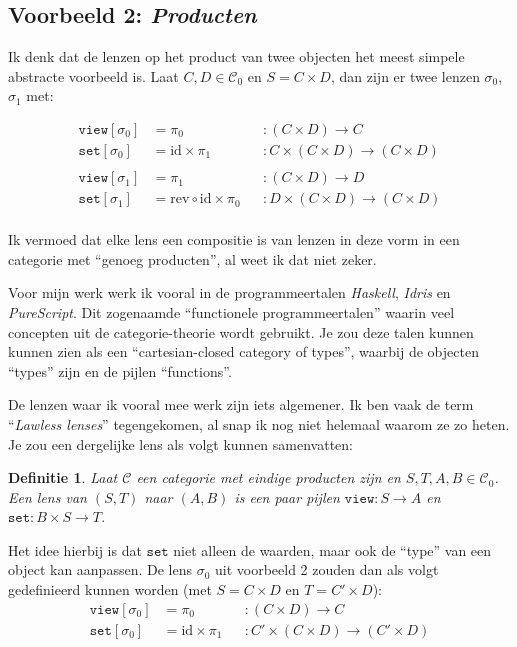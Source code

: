 \documentclass{article}
\newcommand{\id}[0]{\mathrm{id}}
\newtheorem{definition}{Definitie}
\begin{document}
\subsection*{Voorbeeld 2: \emph{Producten}}

Ik denk dat de lenzen op het product van twee objecten het meest simpele abstracte voorbeeld is. Laat $C,D \in \mathcal{C}_0$ en $S = C \times D$, dan zijn er twee lenzen $\sigma_0$, $\sigma_1$ met:

\begin{align*}
	\mathtt{view} [{\sigma_0}] &= \pi_0 &&: (C \times D) \to C \\
	\mathtt{set}  [{\sigma_0}] &= \id \times \pi_1 &&: C \times (C \times D) \to (C \times D) \\
	\\
	\mathtt{view} [{\sigma_1}] &= \pi_1 &&: (C \times D) \to D \\
	\mathtt{set}  [{\sigma_1}] &= \mathrm{rev} \circ \id \times \pi_0 &&: D \times (C \times D) \to (C \times D) \\
\end{align*}

Ik vermoed dat elke lens een compositie is van lenzen in deze vorm in een categorie met ``genoeg producten'', al weet ik dat niet zeker. 

\bigskip

Voor mijn werk werk ik vooral in de programmeertalen \emph{Haskell}, \emph{Idris} en \emph{PureScript}. Dit zogenaamde ``functionele programmeertalen'' waarin veel concepten uit de categorie-theorie wordt gebruikt. Je zou deze talen kunnen kunnen zien als een ``cartesian-closed category of types'', waarbij de objecten ``types'' zijn en de pijlen ``functions''. 

De lenzen waar ik vooral mee werk zijn iets algemener. Ik ben vaak de term ``\emph{Lawless lenses}'' tegengekomen, al snap ik nog niet helemaal waarom ze zo heten. Je zou een dergelijke lens als volgt kunnen samenvatten:

\begin{definition}
	Laat $\mathcal{C}$ een categorie met eindige producten zijn en $S,T,A,B \in \mathcal{C}_0$. Een \emph{lens} van $(S, T)$ naar $(A,B)$ is een paar pijlen $\mathtt{view}: S \to A$ en $\mathtt{set}: B \times S \to T$.
\end{definition}

Het idee hierbij is dat $\mathtt{set}$ niet alleen de waarden, maar ook de ``type'' van een object kan aanpassen. De lens $\sigma_0$ uit voorbeeld 2 zouden dan als volgt gedefinieerd kunnen worden (met $S = C \times D$ en $T = C' \times D$):
\begin{align*}
	\mathtt{view} [{\sigma_0}] &= \pi_0 &&: (C \times D) \to C \\
	\mathtt{set}  [{\sigma_0}] &= \id \times \pi_1 &&: C' \times (C \times D) \to (C' \times D) \\
\end{align*}
\end{document}
